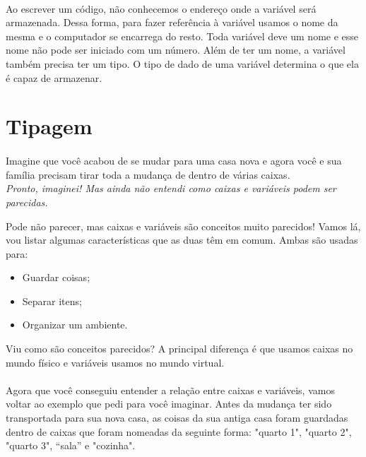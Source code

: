     \paragraph{}
    Ao escrever um código, não conhecemos o endereço onde a variável será armazenada. Dessa forma, para fazer referência à variável usamos o nome da mesma e o computador se encarrega do resto. Toda variável deve um nome e esse nome não pode ser iniciado com um número. Além de ter um nome, a variável também precisa ter um tipo. O tipo de dado de uma variável determina o que ela é capaz de armazenar.
\section{Tipagem}

    \paragraph{}
	Imagine que você acabou de se mudar para uma casa nova e agora você e sua família precisam tirar toda a mudança de dentro de várias caixas.\\
	
	\textit{Pronto, imaginei! Mas ainda não entendi como caixas e variáveis podem ser parecidas.} \par
    Pode não parecer, mas caixas e variáveis são conceitos muito parecidos! Vamos lá, vou listar algumas características que as duas têm em comum. Ambas são usadas para:
    
\begin{itemize}
\item Guardar coisas;
\item Separar itens;
\item Organizar um ambiente.
\end{itemize}

	Viu como são conceitos parecidos? A principal diferença é que usamos caixas no mundo físico e variáveis usamos no mundo virtual.
	
	\paragraph{}
    Agora que você conseguiu entender a relação entre caixas e variáveis, vamos voltar ao exemplo que pedi para você imaginar. Antes da mudança ter sido transportada para sua nova casa, as coisas da sua antiga casa foram guardadas dentro de caixas que foram nomeadas da seguinte forma: "quarto 1", "quarto 2", "quarto 3",  ``sala'' e "cozinha". 
    
